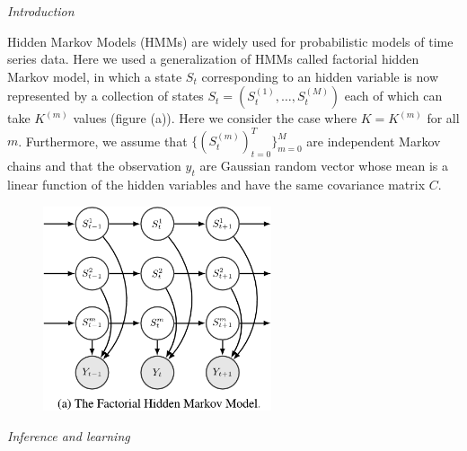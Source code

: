 \documentclass[10pt,a4paper]{report}
\begin{document}
\begin{center}
\end{center}
\vspace{80pt}

\begin{center}
\Huge{\textit{Introduction}}
\end{center}
\vspace{20pt}

\Large{
	
	Hidden Markov Models (HMMs) are widely used for probabilistic models of time series data. Here we used a generalization of HMMs called factorial hidden Markov model, in which a state $S_t$ corresponding to an hidden variable is now represented by a collection of states $S_t = \left(S_t^{(1)},\dots,S_t^{(M)}\right)$ each of which can take $K^{(m)}$ values (figure (a)). Here we consider the case where $K = K^{(m)}$ for all $m$. Furthermore, we assume that $\{(S_t^{(m)})_{t=0}^T\}_{m=0}^M$ are independent Markov chains and that the observation $y_t$ are Gaussian random vector whose mean is a linear function of the hidden variables and have the same covariance matrix $C$.
	\newline
	\newline
	
	}

\begin{figure}[h]
	\centering
	\includegraphics[width=0.6\textwidth]{fHMM.png}
	\label{fig:a}
\end{figure}


\newpage
\begin{center}
\Huge{\textit{Inference and learning}}
\end{center}
\vspace{20pt}
\end{document}
